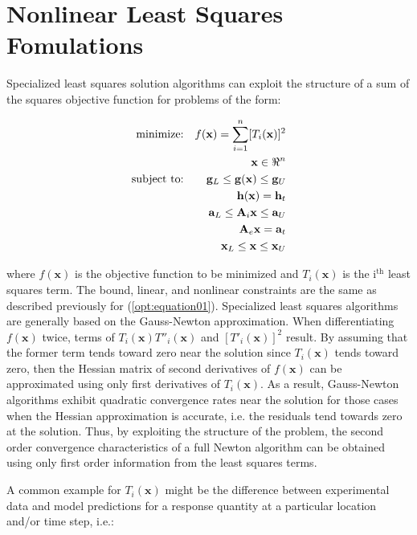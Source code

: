\section{Nonlinear Least Squares Fomulations}\label{nls:formulations}

Specialized least squares solution algorithms can exploit the
structure of a sum of the squares objective function for problems of
the form:

\begin{eqnarray}
  \hbox{minimize:} & & f(\mathbf{x}) =
  \sum_{i=1}^{n}[T_i(\mathbf{x})]^2\nonumber\\
  & & \mathbf{x} \in \Re^{n}\nonumber\\
  \hbox{subject to:} & &
  \mathbf{g}_L \leq \mathbf{g(x)} \leq \mathbf{g}_U\nonumber\\
  & & \mathbf{h(x)}=\mathbf{h}_{t}\label{nls:equation02}\\
  & & \mathbf{a}_L \leq \mathbf{A}_i\mathbf{x} \leq
  \mathbf{a}_U\nonumber\\
  & & \mathbf{A}_e\mathbf{x}=\mathbf{a}_{t}\nonumber\\
  & & \mathbf{x}_L \leq \mathbf{x} \leq \mathbf{x}_U\nonumber
\end{eqnarray}

where $f(\mathbf{x})$ is the objective function to be minimized and
$T_i(\mathbf{x})$ is the i$^{\mathrm{th}}$ least squares term. The
bound, linear, and nonlinear constraints are the same as described
previously for (\ref{opt:equation01}). Specialized least
squares algorithms are generally based on the Gauss-Newton
approximation. When differentiating $f(\mathbf{x})$ twice, terms of
$T_i(\mathbf{x})T''_i(\mathbf{x})$ and $[T'_i(\mathbf{x})]^{2}$
result. By assuming that the former term tends toward zero near the
solution since $T_i(\mathbf{x})$ tends toward zero, then the Hessian
matrix of second derivatives of $f(\mathbf{x})$ can be approximated
using only first derivatives of $T_i(\mathbf{x})$. As a result,
Gauss-Newton algorithms exhibit quadratic convergence rates near the
solution for those cases when the Hessian approximation is accurate,
i.e. the residuals tend towards zero at the solution. Thus, by
exploiting the structure of the problem, the second order convergence
characteristics of a full Newton algorithm can be obtained using only
first order information from the least squares terms.

A common example for $T_i(\mathbf{x})$ might be the difference
between experimental data and model predictions for a response
quantity at a particular location and/or time step, i.e.:

